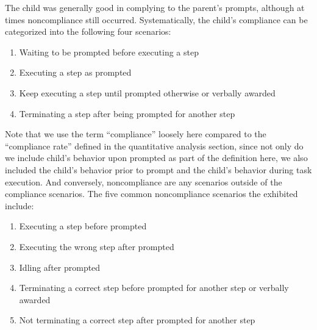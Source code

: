 The child was generally good in complying to the parent's prompts, although at times noncompliance still occurred.  Systematically, the child's compliance can be categorized into the following four scenarios:
\begin{enumerate}
	\item Waiting to be prompted before executing a step
	\item Executing a step as prompted
	\item Keep executing a step until prompted otherwise or verbally awarded
	\item Terminating a step after being prompted for another step
\end{enumerate}
Note that we use the term ``compliance'' loosely here compared to the ``compliance rate'' defined in the quantitative analysis section, since not only do we include child's behavior upon prompted as part of the definition here, we also included the child's behavior prior to prompt and the child's behavior during task execution.  And conversely, noncompliance are any scenarios outside of the compliance scenarios.  The five common noncompliance scenarios the exhibited include:
\label{List:NoncopmlianceBehaviors}
\begin{enumerate}
	\item Executing a step before prompted
	\item Executing the wrong step after prompted
	\item Idling after prompted
	\item Terminating a correct step before prompted for another step or verbally awarded
	\item Not terminating a correct step after prompted for another step
\end{enumerate}

